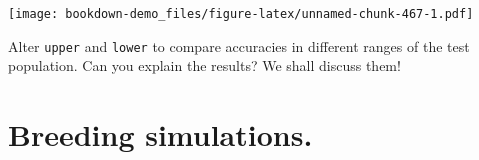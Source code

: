 \documentclass[
]{book}
\begin{document}
\texttt{[image: bookdown-demo\_files/figure-latex/unnamed-chunk-467-1.pdf]}

Alter \texttt{upper} and \texttt{lower} to compare accuracies in different ranges of the test population.
Can you explain the results? We shall discuss them!

\hypertarget{Breeding-simulations}{%
\chapter{Breeding simulations.}\label{Breeding-simulations}}

\backmatter

  

\printindex
\end{document}
